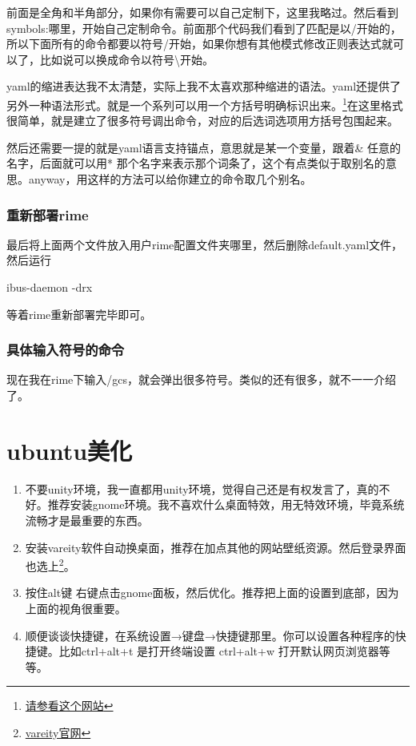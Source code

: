 \documentclass[11pt,oneside]{book}
\begin{document}
前面是全角和半角部分，如果你有需要可以自己定制下，这里我略过。然后看到symbols:哪里，开始自己定制命令。前面那个代码我们看到了匹配是以/开始的，所以下面所有的命令都要以符号/开始，如果你想有其他模式修改正则表达式就可以了，比如说可以换成命令以符号\textbackslash 开始。

yaml的缩进表达我不太清楚，实际上我不太喜欢那种缩进的语法。yaml还提供了另外一种语法形式。就是一个系列可以用一个方括号明确标识出来。\footnote{\href{http://www.dev.idv.tw/mediawiki/index.php/YAML}{请参看这个网站}}在这里格式很简单，就是建立了很多符号调出命令，对应的后选词选项用方括号包围起来。

然后还需要一提的就是yaml语言支持锚点，意思就是某一个变量，跟着\& 任意的名字，后面就可以用* 那个名字来表示那个词条了，这个有点类似于取别名的意思。anyway，用这样的方法可以给你建立的命令取几个别名。

\subsubsection{重新部署rime}
最后将上面两个文件放入用户rime配置文件夹哪里，然后删除default.yaml文件，然后运行
\begin{tcbbash}[]
ibus-daemon   -drx
\end{tcbbash}
等着rime重新部署完毕即可。

\subsubsection{具体输入符号的命令}
现在我在rime下输入/gcs，就会弹出很多符号。类似的还有很多，就不一一介绍了。


\section{ubuntu美化}
\begin{enumerate}
\item 不要unity环境，我一直都用unity环境，觉得自己还是有权发言了，真的不好。推荐安装gnome环境。我不喜欢什么桌面特效，用无特效环境，毕竟系统流畅才是最重要的东西。
\item 安装vareity软件自动换桌面，推荐在加点其他的网站壁纸资源。然后登录界面也选上\footnote{\href{http://peterlevi.com/variety/}{vareity官网}}。
\item 按住alt键 右键点击gnome面板，然后优化。推荐把上面的设置到底部，因为上面的视角很重要。
\item 顺便谈谈快捷键，在系统设置→键盘→快捷键那里。你可以设置各种程序的快捷键。比如ctrl+alt+t 是打开终端设置 ctrl+alt+w 打开默认网页浏览器等等。
\end{enumerate}
\end{document}
